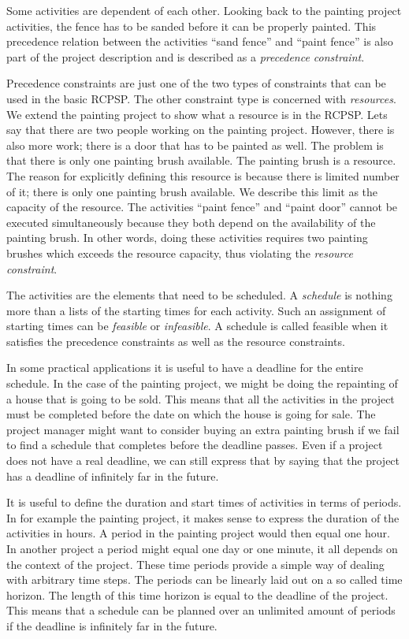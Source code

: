 \documentclass{article}
\theoremstyle{definition}
\begin{document}
Some activities are dependent of each other. 
Looking back to the painting project activities, the fence has to be sanded before it can be properly painted. 
This precedence relation between the activities ``sand fence'' and ``paint fence'' is also part of the project description and is described as a \emph{precedence constraint}. 

Precedence constraints are just one of the two types of constraints that can be used in the basic RCPSP. 
The other constraint type is concerned with \emph{resources}. 
We extend the painting project to show what a resource is in the RCPSP. 
Lets say that there are two people working on the painting project. 
However, there is also more work; there is a door that has to be painted as well. 
The problem is that there is only one painting brush available. The painting brush is a resource. 
The reason for explicitly defining this resource is because there is limited number of it; there is only one painting brush available. 
We describe this limit as the capacity of the resource. 
The activities ``paint fence'' and ``paint door'' cannot be executed simultaneously because they both depend on the availability of the painting brush. 
In other words, doing these activities requires two painting brushes which exceeds the resource capacity, thus violating the \emph{resource constraint}. 

The activities are the elements that need to be scheduled. 
A \emph{schedule} is nothing more than a lists of the starting times for each activity. 
Such an assignment of starting times can be \emph{feasible} or \emph{infeasible}. 
A schedule is called feasible when it satisfies the precedence constraints as well as the resource constraints. 

In some practical applications it is useful to have a deadline for the entire schedule. 
In the case of the painting project, we might be doing the repainting of a house that is going to be sold. 
This means that all the activities in the project must be completed before the date on which the house is going for sale. 
The project manager might want to consider buying an extra painting brush if we fail to find a schedule that completes before the deadline passes. 
Even if a project does not have a real deadline, we can still express that by saying that the project has a deadline of infinitely far in the future. 

It is useful to define the duration and start times of activities in terms of periods. 
In for example the painting project, it makes sense to express the duration of the activities in hours. 
A period in the painting project would then equal one hour. 
In another project a period might equal one day or one minute, it all depends on the context of the project. 
These time periods provide a simple way of dealing with arbitrary time steps. 
The periods can be linearly laid out on a so called time horizon. 
The length of this time horizon is equal to the deadline of the project. 
This means that a schedule can be planned over an unlimited amount of periods if the deadline is infinitely far in the future. 
\end{document}
